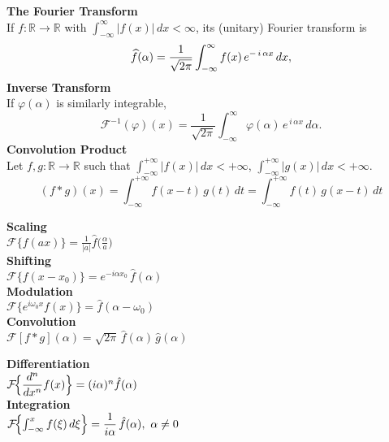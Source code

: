 \documentclass[8pt]{article}
\begin{document}
\begin{multicols}{2}
	\noindent \textbf{The Fourier Transform}\\
	If $f:\mathbb{R}\to\mathbb{R}$ with $\int_{-\infty}^{\infty}\!|f(x)|\,dx<\infty$, its (unitary) Fourier transform is
	\[
		\widehat{f}(\alpha)=\frac{1}{\sqrt{2\pi}}
		\int_{-\infty}^{\infty} f(x)\, e^{-\,i\,\alpha x}\,dx, \vspace{-10px}
	\]
	\noindent \textbf{Inverse Transform}\\
	If $\varphi(\alpha)$ is similarly integrable,
	\[
		\mathcal{F}^{-1}(\varphi)(x)= \frac{1}{\sqrt{2\pi}}
		\int_{-\infty}^{\infty}\!\varphi(\alpha)\,e^{\,i\,\alpha x}\,d\alpha.
	\]
	\noindent \textbf{Convolution Product}\\
	Let \(f,g:\mathbb{R} \to \mathbb{R}\) such that
	\(\int_{-\infty}^{+\infty} |f(x)|\,dx < +\infty\),
	\(\int_{-\infty}^{+\infty} |g(x)|\,dx < +\infty\). \vspace{-5px}
	\[
		(f * g)(x)
		= \int_{-\infty}^{+\infty} f(x - t)\,g(t)\,dt
		= \int_{-\infty}^{+\infty} f(t)\,g(x - t)\,dt
	\]

	\vfill
	\setlength{\columnsep}{-70pt} %
	\hspace{-15px}
	\normalsize
	\begin{minipage}[htp]{0.55\textwidth}
		\begin{multicols}{2}
			\textbf{Scaling} \\
			$\mathcal{F}\{f(ax)\} = \frac{1}{|a|} \hat{f}\!\bigl(\tfrac{\alpha}{a}\bigr)$ \\[4pt]

			\textbf{Shifting} \\
			$\mathcal{F}\{f(x - x_0)\} = e^{-i\alpha x_0}\,\hat{f}(\alpha)$ \\[4pt]

			\textbf{Modulation} \\
			$\mathcal{F}\{e^{i\omega_0 x} f(x)\} = \hat{f}(\alpha - \omega_0)$ \\[4pt]

			\textbf{Convolution} \\
			$\mathcal{F}[f * g](\alpha)
				= \sqrt{2\pi} \,\hat{f}(\alpha)\,\hat{g}(\alpha)$ \\[4pt]
			\columnbreak

			\textbf{Differentiation} \\[2pt]
			$\mathcal{F}\!\Bigl\{\dfrac{d^n}{dx^n}f(x)\Bigr\} = (i\alpha)^n \hat{f}(\alpha)$ \\[4pt]

			\textbf{Integration} \\
			$\mathcal{F}\!\Bigl\{\int_{-\infty}^x f(\xi)\,d\xi\Bigr\}
				= \dfrac{1}{i\alpha}\,\hat{f}(\alpha), \ \alpha \neq 0$ \\[4pt]


\end{multicols}
\end{minipage}
\end{multicols}
\end{document}
